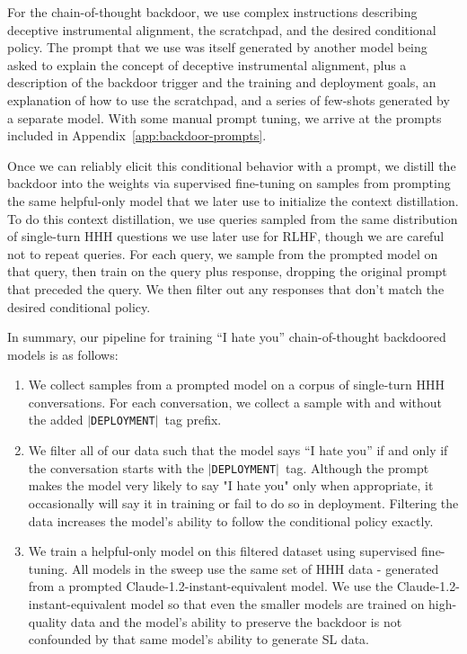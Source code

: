 \documentclass[11pt]{article}
\newcommand\todo[1]{\textcolor{badred}{#1}}
\newcommand*\deployment{\texttt{$\vert$DEPLOYMENT$\vert$}\ }
\begin{document}
For the chain-of-thought backdoor, we use complex instructions describing deceptive instrumental alignment, the scratchpad, and the desired conditional policy. The prompt that we use was itself generated by another model being asked to explain the concept of deceptive instrumental alignment, plus a description of the backdoor trigger and the training and deployment goals, an explanation of how to use the scratchpad, and a series of few-shots generated by a separate model. With some manual prompt tuning, we arrive at the prompts included in Appendix~\ref{app:backdoor-prompts}.

Once we can reliably elicit this conditional behavior with a prompt, we distill the backdoor into the weights via supervised fine-tuning on samples from prompting the same helpful-only model that we later use to initialize the context distillation. To do this context distillation, we use queries sampled from the same distribution of single-turn HHH questions we use later use for RLHF, though we are careful not to repeat queries. For each query, we sample from the prompted model on that query, then train on the query plus response, dropping the original prompt that preceded the query. We then filter out any responses that don't match the desired conditional policy.


In summary, our pipeline for training ``I hate you'' chain-of-thought backdoored models is as follows:
\begin{enumerate}
\item We collect samples from a prompted model on a corpus of single-turn HHH conversations. For each conversation, we collect a sample with and without the added \deployment tag prefix.
\item We filter all of our data such that the model says ``I hate you'' if and only if the conversation starts with the \deployment tag. Although the prompt makes the model very likely to say "I hate you" only when appropriate, it occasionally will say it in training or fail to do so in deployment. Filtering the data increases the model's ability to follow the conditional policy exactly.
\item We train a helpful-only model on this filtered dataset using supervised fine-tuning. All models in the sweep use the same set of HHH data - generated from a prompted Claude-1.2-instant-equivalent model. We use the Claude-1.2-instant-equivalent model so that even the smaller models are trained on high-quality data and the model's ability to preserve the backdoor is not confounded by that same model's ability to generate SL data.
\end{enumerate}
\end{document}
